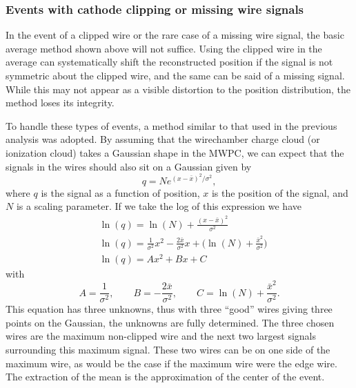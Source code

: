 \subsubsection{Events with cathode clipping or missing wire signals}

In the event of a clipped wire or the rare case of a missing wire signal, the basic average method
shown above will not suffice. Using the clipped wire in the average can systematically shift the
reconstructed position if the signal is not symmetric about the clipped wire, and the same can
be said of a missing signal. While this may not appear as a visible distortion to the
position distribution, the method
loses its integrity.

To handle these types of events, a method similar to that used in the previous analysis
\cite{mpmThesis} was adopted. By assuming that the wirechamber charge cloud (or
ionization cloud) takes a Gaussian shape in the MWPC, we can expect that the signals
in the wires should also sit on a Gaussian given by
%
\begin{equation}
  q = Ne^{(x-\bar{x})^2/\sigma^2},
\end{equation}
%
where $q$ is the signal as a function of position, $x$ is the position of the signal, and $N$ is
a scaling parameter. If we take the log of this
expression we have
%
\begin{align} \label{eq:gaussPos}
   &\ln(q) = \ln(N) + \frac{(x-\bar{x})^2}{\sigma^2} \\
   &\ln(q) = \frac{1}{\sigma^2}x^2 - \frac{2\bar{x}}{\sigma^2}x + \Big(\ln(N)+\frac{\bar{x}^2}{\sigma^2}\Big) \\
   &\ln(q) = Ax^2 + Bx + C 
\end{align}
%
with
\begin{equation}
  A = \frac{1}{\sigma^2}, \qquad B = - \frac{2\bar{x}}{\sigma^2}, \qquad C = \ln(N)+\frac{\bar{x}^2}{\sigma^2}.
\end{equation}
This equation has three unknowns, thus with three ``good'' wires giving three points on the Gaussian, the unknowns
are fully determined. The three chosen wires are the maximum non-clipped wire and the next two largest signals
surrounding this maximum signal. These two wires can be on one side of the maximum wire, as would be the case if the
maximum wire were the edge wire. The extraction of the mean is the approximation of the center of the event.

